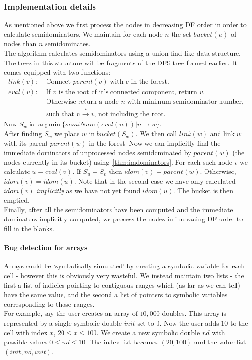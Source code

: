\documentclass[12pt,a4paper]{article}
\DeclareMathOperator*{\argmin}{arg\,min}
\begin{document}
\begin{enumerate}
\subsubsection{Implementation details}
As mentioned above we first process the nodes in decreasing DF order in order to calculate semidominators. We maintain for each node $n$ the set $bucket(n)$ of nodes
than $n$ semidominates.\\
The algorithm calculates semidominators using a union-find-like data structure. The trees in this structure will be fragments of the DFS tree formed earlier. It comes equipped with two functions:
\begin{align*}
link(v): &\text{ Connect $parent(v)$ with $v$ in the forest.}\\
eval(v): &\text{ If $v$ is the root of it's connected component, return $v$.}\\
   &\text{ Otherwise return a node $n$ with minimum semidominator number,}\\
   &\text{ such that $n \xrightarrow{*} v$,  not including the root.}
\end{align*}
Now $S_w$ is $\argmin\{semiNum(eval(n)) |n \to w\}$.\\
 After finding $S_w$ we place $w$ in $bucket(S_w)$. We then call $link(w)$ and link $w$ with its parent $parent(w)$ in the forest. Now we can implicitly find the immediate dominators of unprocessed nodes semidominated by $parent(w)$ (the nodes currently in its bucket) using~\cref{thm:imdominators}. 
 For each such node $v$ we calculate $u = eval(v)$. If $S_u = S_v$ then $idom(v) = parent(w)$. Otherwise, $idom(v) = idom(u)$. Note that in the second case we have only calculated $idom(v)$ \textit{implicitly} as we have not yet found $idom(u)$. 
 The bucket is then emptied.\\
Finally, after all the semidominators have been computed and the immediate dominators implicitly computed, we process the nodes in increacing DF order to fill in the blanks.\par

\paragraph{Bug detection for arrays}
Arrays could be `symbolically simulated' by creating a symbolic variable for each cell - however this is obviously very wasteful. We instead maintain two lists - 
the first a list of indicies pointing to contiguous ranges which (as far as we can tell) have the same value, and the second a list of pointers to symbolic variables corresponding to those ranges.\\
For example, say the user creates an array of $10,000$ doubles. This array is represented
by a single symbolic double $init$ set to 0. Now the user adds $10$ to the cell with index $x$, $20 \leq x \leq 100$. We create a new symbolic double $nd$ with possible values $0 \leq nd \leq 10$.
The index list becomes $(20, 100)$ and the value list $(init, nd, init)$.


\end{enumerate}
\end{document}
